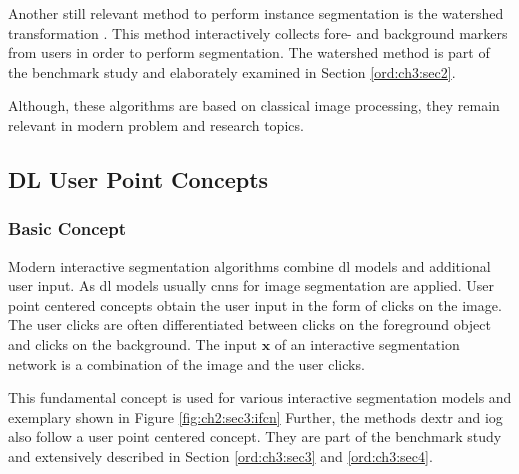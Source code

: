Another still relevant method to perform instance segmentation is the watershed transformation \cite{VS91-Watershed}.
This method interactively collects fore- and background markers from users in order to perform segmentation.
The watershed method is part of the benchmark study and elaborately examined in Section \ref{ord:ch3:sec2}.

 
Although, these algorithms are based on classical image processing, they remain relevant in modern problem and research topics.


\subsection{DL User Point Concepts}\label{ord:ch2:sec3:subsec2}

\subsubsection{Basic Concept}
Modern interactive segmentation algorithms combine \gls{dl} models and additional user input.
As \gls{dl} models usually \glspl{cnn} for image segmentation are applied.
User point centered concepts obtain the user input in the form of clicks on the image.
The user clicks are often differentiated between clicks on the foreground object and clicks on the background.
The input $\textbf{x}$ of an interactive segmentation network is a combination of the image and the user clicks.

This fundamental concept is used for various interactive segmentation models \cite{Xu16-InteractiveObjectSelection} \cite{MVL18-ITIS} and exemplary shown in Figure \ref{fig:ch2:sec3:ifcn}
Further, the methods \gls{dextr}  \cite{Man18-DEXTR} and \gls{iog} \cite{Zha20-IOG} also follow a user point centered concept. They are part of the benchmark study and extensively described in Section \ref{ord:ch3:sec3} and \ref{ord:ch3:sec4}.

